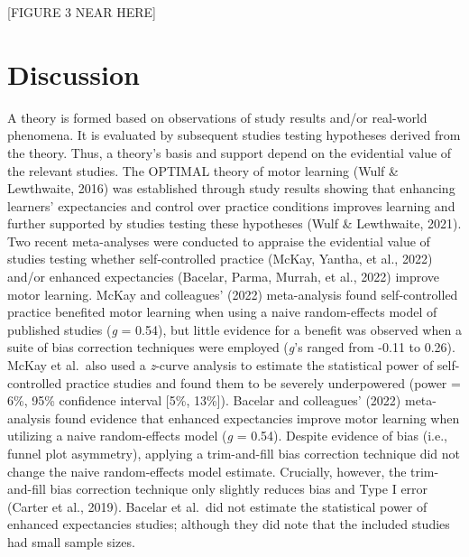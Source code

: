 \documentclass[
  man, donotrepeattitle,mask,floatsintext]{apa7}
\begin{document}
\begin{center}
[FIGURE 3 NEAR HERE]
\end{center}

\hypertarget{discussion}{%
\section{Discussion}\label{discussion}}

A theory is formed based on observations of study results and/or real-world phenomena. It is evaluated by subsequent studies testing hypotheses derived from the theory. Thus, a theory's basis and support depend on the evidential value of the relevant studies. The OPTIMAL theory of motor learning (Wulf \& Lewthwaite, 2016) was established through study results showing that enhancing learners' expectancies and control over practice conditions improves learning and further supported by studies testing these hypotheses (Wulf \& Lewthwaite, 2021). Two recent meta-analyses were conducted to appraise the evidential value of studies testing whether self-controlled practice (McKay, Yantha, et al., 2022) and/or enhanced expectancies (Bacelar, Parma, Murrah, et al., 2022) improve motor learning. McKay and colleagues' (2022) meta-analysis found self-controlled practice benefited motor learning when using a naive random-effects model of published studies (\emph{g} = 0.54), but little evidence for a benefit was observed when a suite of bias correction techniques were employed (\emph{g}'s ranged from -0.11 to 0.26). McKay et al.~also used a \emph{z}-curve analysis to estimate the statistical power of self-controlled practice studies and found them to be severely underpowered (power = 6\%, 95\% confidence interval {[}5\%, 13\%{]}). Bacelar and colleagues' (2022) meta-analysis found evidence that enhanced expectancies improve motor learning when utilizing a naive random-effects model (\emph{g} = 0.54). Despite evidence of bias (i.e., funnel plot asymmetry), applying a trim-and-fill bias correction technique did not change the naive random-effects model estimate. Crucially, however, the trim-and-fill bias correction technique only slightly reduces bias and Type I error (Carter et al., 2019). Bacelar et al.~did not estimate the statistical power of enhanced expectancies studies; although they did note that the included studies had small sample sizes.
\end{document}
